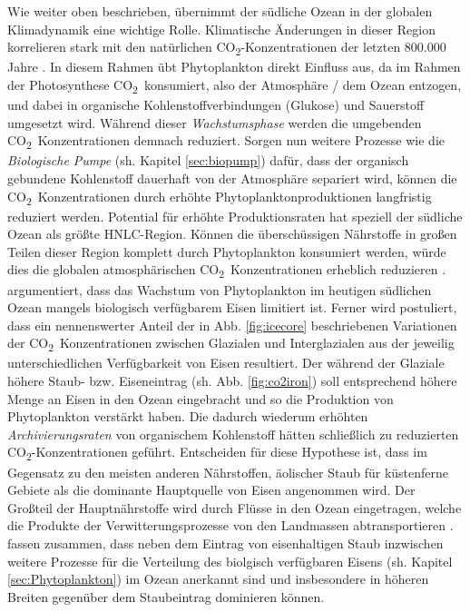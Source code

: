 \documentclass[12pt,a4paper,onecolumn,draft]{scrartcl}
\newcommand{\cotwo}{CO\textsubscript{2}}
\begin{document}
Wie weiter oben beschrieben, übernimmt der südliche Ozean in der globalen Klimadynamik eine wichtige Rolle. Klimatische Änderungen in dieser Region korrelieren stark mit den natürlichen \cotwo -Konzentrationen der letzten 800.000 Jahre \citep{Fischer.2010}. In diesem Rahmen übt Phytoplankton direkt Einfluss aus, da im Rahmen der Photosynthese \cotwo \ konsumiert, also der Atmosphäre / dem Ozean entzogen, und dabei in organische Kohlenstoffverbindungen (Glukose) und Sauerstoff umgesetzt wird. Während dieser \textit{Wachstumsphase} werden die umgebenden \cotwo \ Konzentrationen demnach reduziert. Sorgen nun weitere Prozesse wie die \textit{Biologische Pumpe} (sh. Kapitel \ref{sec:biopump}) dafür, dass der organisch gebundene Kohlenstoff dauerhaft von der Atmosphäre separiert wird, können die \cotwo \ Konzentrationen durch erhöhte Phytoplanktonproduktionen langfristig reduziert werden. Potential für erhöhte Produktionsraten hat speziell der südliche Ozean als größte HNLC-Region. Können die überschüssigen Nährstoffe in großen Teilen dieser Region komplett durch Phytoplankton konsumiert werden, würde dies die globalen atmosphärischen \cotwo \ Konzentrationen erheblich reduzieren \citep{Martin.1990}. \citet{Martin.1990} argumentiert, dass das Wachstum von Phytoplankton im heutigen südlichen Ozean mangels biologisch verfügbarem Eisen limitiert ist. Ferner wird postuliert, dass ein nennenswerter Anteil der in Abb. \ref{fig:icecore} beschriebenen Variationen der \cotwo \ Konzentrationen zwischen Glazialen und Interglazialen aus der jeweilig unterschiedlichen Verfügbarkeit von Eisen resultiert. Der während der Glaziale höhere Staub- bzw. Eiseneintrag (sh. Abb. \ref{fig:co2iron}) soll entsprechend höhere Menge an Eisen in den Ozean eingebracht und so die Produktion von Phytoplankton verstärkt haben. Die dadurch wiederum erhöhten \textit{Archivierungsraten} von organischem Kohlenstoff hätten schließlich zu reduzierten \cotwo-Konzentrationen geführt. Entscheiden für diese Hypothese ist, dass im Gegensatz zu den meisten anderen Nährstoffen, äolischer Staub für küstenferne Gebiete als die dominante Hauptquelle von Eisen angenommen wird. Der Großteil der Hauptnährstoffe wird durch Flüsse in den Ozean eingetragen, welche die Produkte der Verwitterungsprozesse von den Landmassen abtransportieren \citep{Emerson.2009}. \citet{Tagliabue.2017} fassen zusammen, dass neben dem Eintrag von eisenhaltigen Staub inzwischen weitere Prozesse für die Verteilung des biolgisch verfügbaren Eisens (sh. Kapitel \ref{sec:Phytoplankton}) im Ozean anerkannt sind und insbesondere in höheren Breiten gegenüber dem Staubeintrag dominieren können.\\
\end{document}
